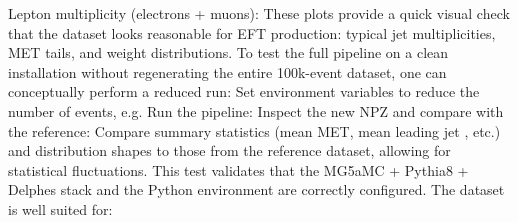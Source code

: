 \markdownRendererUlItem Lepton multiplicity (electrons + muons):\markdownRendererParagraphSeparator
{}\markdownRendererUlItemEnd 
\markdownRendererUlEnd \markdownRendererInterblockSeparator
{}These plots provide a quick visual check that the dataset looks reasonable for EFT  production: typical jet multiplicities, MET tails, and weight distributions.\markdownRendererInterblockSeparator
{}
\markdownRendererSectionEnd \markdownRendererSectionBegin
{}\markdownRendererInterblockSeparator
{}To test the full pipeline on a clean installation without regenerating the entire 100k-event dataset, one can conceptually perform a reduced run:\markdownRendererInterblockSeparator
{}\markdownRendererOlBegin
{}Set environment variables to reduce the number of events, e.g.\markdownRendererInterblockSeparator
{}\markdownRendererOlItemEnd 
{}Run the pipeline:\markdownRendererInterblockSeparator
{}\markdownRendererOlItemEnd 
{}Inspect the new NPZ and compare with the reference:\markdownRendererInterblockSeparator
{}\markdownRendererOlItemEnd 
{}Compare summary statistics (mean MET, mean leading jet , etc.) and distribution shapes to those from the reference dataset, allowing for statistical fluctuations.\markdownRendererOlItemEnd 
\markdownRendererOlEnd \markdownRendererInterblockSeparator
{}This test validates that the MG5\markdownRendererUnderscore{}aMC + Pythia8 + Delphes stack and the Python environment are correctly configured.\markdownRendererInterblockSeparator
{}
\markdownRendererSectionEnd 
\markdownRendererSectionEnd \markdownRendererSectionBegin
{}\markdownRendererInterblockSeparator
{}\markdownRendererSectionBegin
{}\markdownRendererInterblockSeparator
{}The dataset is well suited for:\markdownRendererInterblockSeparator
